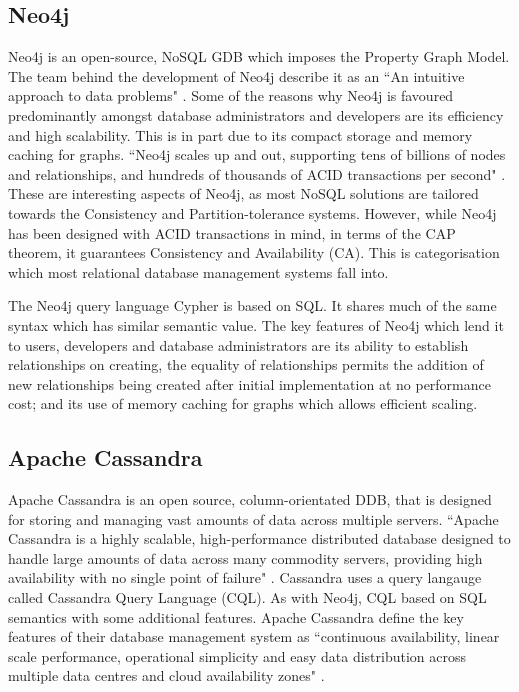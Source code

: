 \subsection{Neo4j}\label{neo}
Neo4j is an open-source, NoSQL GDB which imposes the Property Graph Model. The team behind the development of Neo4j describe it as an ``An intuitive approach to data problems" \cite{ndweb}. Some of the reasons why Neo4j is favoured predominantly amongst database administrators and developers are its efficiency and high scalability. This is in part due to its compact storage and memory caching for graphs. ``Neo4j scales up and out, supporting tens of billions of nodes and relationships, and hundreds of thousands of ACID transactions per second" \cite{ndweb}. These are interesting aspects of Neo4j, as most NoSQL solutions are tailored towards the Consistency and Partition-tolerance systems. However, while Neo4j has been designed with ACID transactions in mind, in terms of the CAP theorem, it guarantees Consistency and Availability (CA). This is categorisation which most relational database management systems fall into.

The Neo4j query language Cypher is based on SQL. It shares much of the same syntax which has similar semantic value. The key features of Neo4j which lend it to users, developers and database administrators are its ability to establish relationships on creating, the equality of relationships permits the addition of new relationships being created after initial implementation at no performance cost; and its use of memory caching for graphs which allows efficient scaling.

\subsection{Apache Cassandra}\label{cassandra}
Apache Cassandra is an open source, column-orientated DDB, that is designed for storing and managing vast amounts of data across multiple servers. ``Apache Cassandra is a highly scalable, high-performance distributed database designed to handle large amounts of data across many commodity servers, providing high availability with no single point of failure" \cite{cassandra}. Cassandra uses a query langauge called Cassandra Query Language (CQL). As with Neo4j, CQL based on SQL semantics with some additional features. Apache Cassandra define the key features of their database management system as ``continuous availability, linear scale performance, operational simplicity and easy data distribution across multiple data centres and cloud availability zones" \cite{cassandra}.

